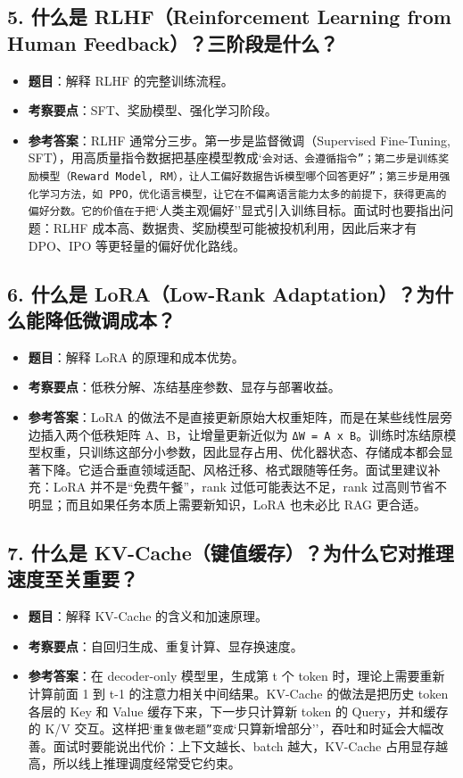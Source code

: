 \subsection{5. 什么是 RLHF（Reinforcement Learning from Human Feedback）？三阶段是什么？}
\begin{itemize}[leftmargin=2em]
\item \textbf{题目}：解释 RLHF 的完整训练流程。
\item \textbf{考察要点}：SFT、奖励模型、强化学习阶段。
\item \textbf{参考答案}：RLHF 通常分三步。第一步是监督微调（Supervised Fine-Tuning, SFT），用高质量指令数据把基座模型教成`\texttt{会对话、会遵循指令''；第二步是训练奖励模型（Reward Model, RM），让人工偏好数据告诉模型}\texttt{哪个回答更好''；第三步是用强化学习方法，如 PPO，优化语言模型，让它在不偏离语言能力太多的前提下，获得更高的偏好分数。它的价值在于把}`人类主观偏好''显式引入训练目标。面试时也要指出问题：RLHF 成本高、数据贵、奖励模型可能被投机利用，因此后来才有 DPO、IPO 等更轻量的偏好优化路线。
\end{itemize}

\subsection{6. 什么是 LoRA（Low-Rank Adaptation）？为什么能降低微调成本？}
\begin{itemize}[leftmargin=2em]
\item \textbf{题目}：解释 LoRA 的原理和成本优势。
\item \textbf{考察要点}：低秩分解、冻结基座参数、显存与部署收益。
\item \textbf{参考答案}：LoRA 的做法不是直接更新原始大权重矩阵，而是在某些线性层旁边插入两个低秩矩阵 A、B，让增量更新近似为 \texttt{ΔW = A x B}。训练时冻结原模型权重，只训练这部分小参数，因此显存占用、优化器状态、存储成本都会显著下降。它适合垂直领域适配、风格迁移、格式跟随等任务。面试里建议补充：LoRA 并不是``免费午餐''，rank 过低可能表达不足，rank 过高则节省不明显；而且如果任务本质上需要新知识，LoRA 也未必比 RAG 更合适。
\end{itemize}

\subsection{7. 什么是 KV-Cache（键值缓存）？为什么它对推理速度至关重要？}
\begin{itemize}[leftmargin=2em]
\item \textbf{题目}：解释 KV-Cache 的含义和加速原理。
\item \textbf{考察要点}：自回归生成、重复计算、显存换速度。
\item \textbf{参考答案}：在 decoder-only 模型里，生成第 t 个 token 时，理论上需要重新计算前面 1 到 t-1 的注意力相关中间结果。KV-Cache 的做法是把历史 token 各层的 Key 和 Value 缓存下来，下一步只计算新 token 的 Query，并和缓存的 K/V 交互。这样把`\texttt{重复做老题''变成}`只算新增部分''，吞吐和时延会大幅改善。面试时要能说出代价：上下文越长、batch 越大，KV-Cache 占用显存越高，所以线上推理调度经常受它约束。
\end{itemize}

